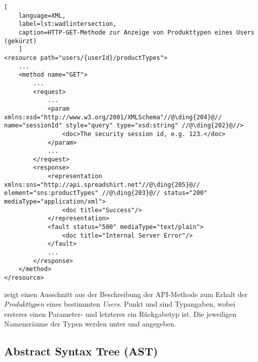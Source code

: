 \begin{lstlisting}[
    language=XML,
    label=lst:wadlintersection,
    caption=HTTP-GET-Methode zur Anzeige von Produkttypen eines Users (gekürzt)
    ]
<resource path="users/{userId}/productTypes">
    ...
    <method name="GET">
        ...
        <request>
            ...
            <param xmlns:xsd="http://www.w3.org/2001/XMLSchema"//@\ding{204}@// name="sessionId" style="query" type="xsd:string" //@\ding{202}@//>
                <doc>The security session id, e.g. 123.</doc>
            </param>
            ...
        </request>
        <response>
            <representation xmlns:sns="http://api.spreadshirt.net"//@\ding{205}@// element="sns:productTypes" //@\ding{203}@// status="200" mediaType="application/xml">
                <doc title="Success"/>
            </representation>
            <fault status="500" mediaType="text/plain">
                <doc title="Internal Server Error"/>
            </fault>
            ...
        </response>
    </method>
</resource>
\end{lstlisting}

 zeigt einen Ausschnitt aus der Beschreibung der API-Methode zum Erhalt der \emph{Produkttypen} eines bestimmten \emph{Users}. Punkt  und  sind Typangaben, wobei ersteres einen Parameter- und letzteres ein Rückgabetyp ist. Die jeweiligen Namensräume der Typen werden unter  und  angegeben.


\subsection{Abstract Syntax Tree (AST)}
\label{sec:ast}

